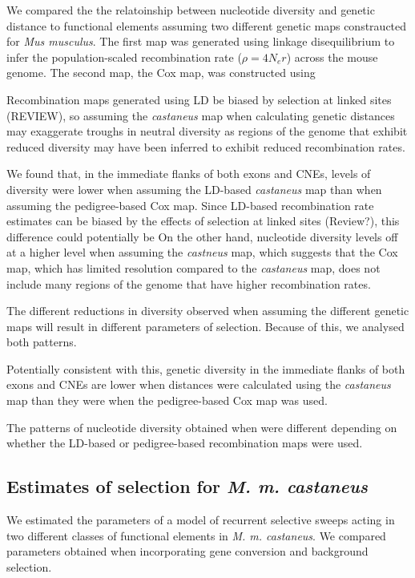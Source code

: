 \documentclass[11pt]{article}
\begin{document}
	We compared the the relatoinship between nucleotide diversity and genetic distance to functional elements assuming two different genetic maps constraucted for \textit{Mus musculus}. The first map was generated using linkage disequilibrium to infer the population-scaled recombination rate ($\rho = 4N_er$) across the mouse genome. The second map, the Cox map, was constructed using 
	
	Recombination maps generated using LD  be biased by selection at linked sites (REVIEW), so assuming the \textit{castaneus} map when calculating genetic distances may exaggerate troughs in neutral diversity as regions of the genome that exhibit reduced diversity may have been inferred to exhibit reduced recombination rates.
	
We found that, in the immediate flanks of both exons and CNEs, levels of diversity were lower when assuming the LD-based \textit{castaneus} map than when assuming the pedigree-based Cox map. Since LD-based recombination rate estimates can be biased by the effects of selection at linked sites (Review?), this difference could potentially be 
On the other hand, nucleotide diversity levels off at a higher level when assuming the \textit{castneus} map, which suggests that the Cox map, which has limited resolution compared to the \textit{castaneus} map, does not include many regions of the genome that have higher recombination rates. 

The different reductions in diversity observed when assuming the different genetic maps will result in different parameters of selection. Because of this, we analysed both patterns.

	Potentially consistent with this, genetic diversity in the immediate flanks of both exons and CNEs are lower when distances were calculated using the \textit{castaneus} map than they were when the pedigree-based Cox map was used.
	
		The patterns of nucleotide diversity obtained when were different depending on whether the LD-based or pedigree-based recombination maps were used. 
	
\subsection*{Estimates of selection for \textit{M. m. castaneus}}

	We estimated the parameters of a model of recurrent selective sweeps acting in two different classes of functional elements in \textit{M. m. castaneus}. We compared parameters obtained when incorporating gene conversion and background selection.
	
\end{document}
